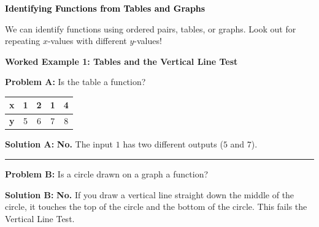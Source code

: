 \documentclass[12pt, letterpaper, fleqn]{article}
\begin{document}
\vspace{4mm}

\newpage

\begin{tcolorbox}[colback=customteal!20]
\large\textcolor{black}{\textbf{Identifying Functions from Tables and Graphs}}
\end{tcolorbox}

\noindent
We can identify functions using ordered pairs, tables, or graphs. Look out for repeating $x$-values with different $y$-values!

\vspace{3mm}

\begin{tcolorbox}[colback=white, colframe=black!25, boxrule=0.6pt, arc=4mm, left=6mm, right=6mm, top=5mm, bottom=5mm]

\textbf{Worked Example 1: Tables and the Vertical Line Test}

\medskip

\textbf{Problem A:} Is the table a function?
\begin{tabular}{|c|c|c|c|c|}
\hline
\textbf{x} & 1 & 2 & 1 & 4 \\
\hline
\textbf{y} & 5 & 6 & 7 & 8 \\
\hline
\end{tabular}

\medskip

\textbf{Solution A:} \textbf{No.} The input $1$ has two different outputs ($5$ and $7$).

\medskip
\hrule
\medskip

\textbf{Problem B:} Is a circle drawn on a graph a function?

\medskip

\textbf{Solution B:} \textbf{No.} If you draw a vertical line straight down the middle of the circle, it touches the top of the circle and the bottom of the circle. This fails the Vertical Line Test.

\end{tcolorbox}

\vspace{4mm}
\end{document}
